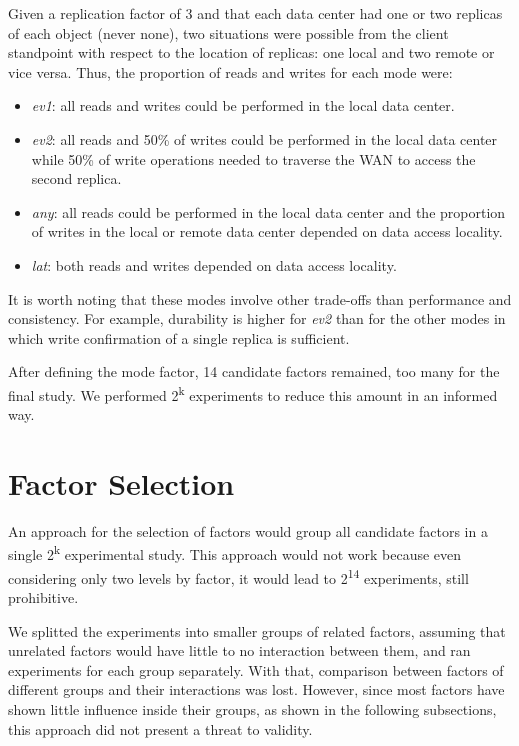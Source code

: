 \documentclass[doublespacing]{bmcart}
\begin{document}
Given a replication factor of 3 and that each data center had one or two
replicas of each object (never none), two situations were possible from the
client standpoint with respect to the location of replicas: one local and two
remote or vice versa. Thus, the proportion of reads and writes for each mode
were:

\begin{itemize}

\item \textit{ev1}: all reads and writes could be performed in the local data
center.

\item \textit{ev2}: all reads and 50\% of writes could be performed in the
local data center while 50\% of write operations needed to traverse the WAN to
access the second replica.

\item \textit{any}: all reads could be performed in the local data center and
the proportion of writes in the local or remote data center depended on data
access locality.

\item \textit{lat}: both reads and writes depended on data access locality. 

\end{itemize}

It is worth noting that these modes involve other trade-offs than performance
and consistency. For example, durability is higher for \textit{ev2} than for
the other modes in which write confirmation of a single replica is sufficient.

After defining the mode factor, 14 candidate factors remained, too many for the
final study. We performed 2\textsuperscript{k} experiments to reduce this
amount in an informed way.

\section{Factor Selection}

An approach for the selection of factors would group all candidate factors in a
single 2\textsuperscript{k} experimental study. This approach would not work
because even considering only two levels by factor, it would lead to
2\textsuperscript{14} experiments, still prohibitive.

We splitted the experiments into smaller groups of related factors, assuming
that unrelated factors would have little to no interaction between them, and
ran experiments for each group separately. With that, comparison between
factors of different groups and their interactions was lost. However, since
most factors have shown little influence inside their groups, as shown in the
following subsections, this approach did not present a threat to validity.
\end{document}
